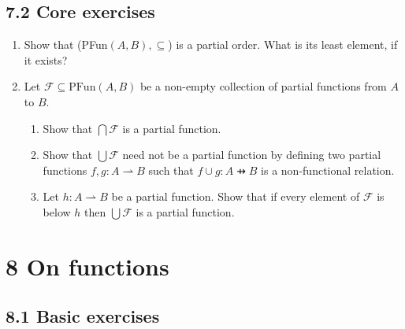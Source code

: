 \documentclass[10pt,\jkfside,a4paper]{article}
\begin{document}
\subsection*{7.2 Core exercises}

\begin{enumerate}

\item Show that (PFun$(A, B), \subseteq$) is a partial order. What is its least element, if it exists?



\item Let $\mathcal{F} \subseteq \text{PFun}(A, B)$ be a non-empty collection of partial functions from $A$ to $B$.

\begin{enumerate}

\item Show that $\bigcap \mathcal{F}$ is a partial function.



\item Show that $\bigcup \mathcal{F}$ need not be a partial function by defining two partial functions $f, g: A \rightharpoonup B$ 
such that $f \cup g: A \pfun B$ is a non-functional relation.



\item Let $h: A \rightharpoonup B$ be a partial function. Show that if every element of $\mathcal{F}$ is below $h$ then $\bigcup \mathcal{F}$ is 
a partial function.



\end{enumerate}

\end{enumerate}

\section*{8 On functions}

\subsection*{8.1 Basic exercises}
\end{document}
